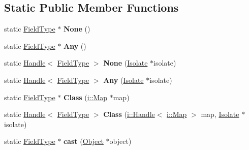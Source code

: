 \subsection*{Static Public Member Functions}
\begin{DoxyCompactItemize}
\item 
static \hyperlink{classv8_1_1internal_1_1_field_type}{Field\+Type} $\ast$ {\bfseries None} ()\hypertarget{classv8_1_1internal_1_1_field_type_aa450aa8f14f11cd75dac6cc01e3e5503}{}\label{classv8_1_1internal_1_1_field_type_aa450aa8f14f11cd75dac6cc01e3e5503}

\item 
static \hyperlink{classv8_1_1internal_1_1_field_type}{Field\+Type} $\ast$ {\bfseries Any} ()\hypertarget{classv8_1_1internal_1_1_field_type_a2c61c907d22a6e3036f742e12bb8772c}{}\label{classv8_1_1internal_1_1_field_type_a2c61c907d22a6e3036f742e12bb8772c}

\item 
static \hyperlink{classv8_1_1internal_1_1_handle}{Handle}$<$ \hyperlink{classv8_1_1internal_1_1_field_type}{Field\+Type} $>$ {\bfseries None} (\hyperlink{classv8_1_1internal_1_1_isolate}{Isolate} $\ast$isolate)\hypertarget{classv8_1_1internal_1_1_field_type_ac2d0cb4663e07e8c3498503f33fc399d}{}\label{classv8_1_1internal_1_1_field_type_ac2d0cb4663e07e8c3498503f33fc399d}

\item 
static \hyperlink{classv8_1_1internal_1_1_handle}{Handle}$<$ \hyperlink{classv8_1_1internal_1_1_field_type}{Field\+Type} $>$ {\bfseries Any} (\hyperlink{classv8_1_1internal_1_1_isolate}{Isolate} $\ast$isolate)\hypertarget{classv8_1_1internal_1_1_field_type_ad4bdf153640a489fce033623e4203c8c}{}\label{classv8_1_1internal_1_1_field_type_ad4bdf153640a489fce033623e4203c8c}

\item 
static \hyperlink{classv8_1_1internal_1_1_field_type}{Field\+Type} $\ast$ {\bfseries Class} (\hyperlink{classv8_1_1internal_1_1_map}{i\+::\+Map} $\ast$map)\hypertarget{classv8_1_1internal_1_1_field_type_adb04733442306c440199bc0aa83d1e6f}{}\label{classv8_1_1internal_1_1_field_type_adb04733442306c440199bc0aa83d1e6f}

\item 
static \hyperlink{classv8_1_1internal_1_1_handle}{Handle}$<$ \hyperlink{classv8_1_1internal_1_1_field_type}{Field\+Type} $>$ {\bfseries Class} (\hyperlink{classv8_1_1internal_1_1_handle}{i\+::\+Handle}$<$ \hyperlink{classv8_1_1internal_1_1_map}{i\+::\+Map} $>$ map, \hyperlink{classv8_1_1internal_1_1_isolate}{Isolate} $\ast$isolate)\hypertarget{classv8_1_1internal_1_1_field_type_a1e6e37cd4d489f4f070371387acbb0b0}{}\label{classv8_1_1internal_1_1_field_type_a1e6e37cd4d489f4f070371387acbb0b0}

\item 
static \hyperlink{classv8_1_1internal_1_1_field_type}{Field\+Type} $\ast$ {\bfseries cast} (\hyperlink{classv8_1_1internal_1_1_object}{Object} $\ast$object)\hypertarget{classv8_1_1internal_1_1_field_type_a069e3764d6aaf523475e6236b4f7e285}{}\label{classv8_1_1internal_1_1_field_type_a069e3764d6aaf523475e6236b4f7e285}

\end{DoxyCompactItemize}
